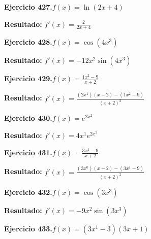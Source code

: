 \documentclass[10pt,a4paper]{article}
\begin{document}
\newpage
\begin{ejbox}
\textbf{Ejercicio 427.}\quad $f(x) = \ln(2x + 4)$
\end{ejbox}

\begin{solbox}
\textbf{Resultado:} \(\displaystyle f'(x) = \frac{2}{2x + 4}\)
\end{solbox}

\begin{ejbox}
\textbf{Ejercicio 428.}\quad $f(x) = \cos(4x^{3})$
\end{ejbox}

\begin{solbox}
\textbf{Resultado:} \(\displaystyle f'(x) = -12x^{2}\sin(4x^{3})\)
\end{solbox}

\begin{ejbox}
\textbf{Ejercicio 429.}\quad $f(x) = \frac{1x^{2} -9}{x + 2}$
\end{ejbox}

\begin{solbox}
\textbf{Resultado:} \(\displaystyle f'(x) = \frac{(2x^{1})(x+2) - (1x^{2} -9)}{(x+2)^2}\)
\end{solbox}

\newpage
\begin{ejbox}
\textbf{Ejercicio 430.}\quad $f(x) = e^{2x^{2}}$
\end{ejbox}

\begin{solbox}
\textbf{Resultado:} \(\displaystyle f'(x) = 4x^{1}e^{2x^{2}}\)
\end{solbox}

\begin{ejbox}
\textbf{Ejercicio 431.}\quad $f(x) = \frac{3x^{1} -9}{x + 2}$
\end{ejbox}

\begin{solbox}
\textbf{Resultado:} \(\displaystyle f'(x) = \frac{(3x^{0})(x+2) - (3x^{1} -9)}{(x+2)^2}\)
\end{solbox}

\begin{ejbox}
\textbf{Ejercicio 432.}\quad $f(x) = \cos(3x^{3})$
\end{ejbox}

\begin{solbox}
\textbf{Resultado:} \(\displaystyle f'(x) = -9x^{2}\sin(3x^{3})\)
\end{solbox}

\newpage
\begin{ejbox}
\textbf{Ejercicio 433.}\quad $f(x) = (3x^{1} -3)(3x +1)$
\end{ejbox}
\end{document}
